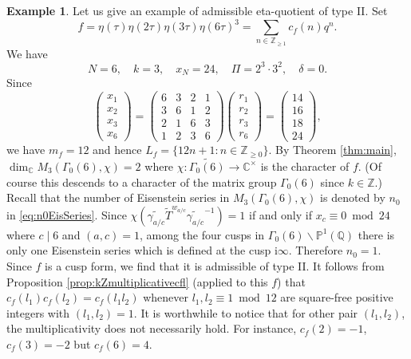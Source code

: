 \documentclass[12pt]{amsart}
\numberwithin{equation}{section}
\theoremstyle{plain}
\theoremstyle{definition}
\newtheorem{examp}[thm]{Example}
\theoremstyle{remark}
\newcommand\rmi{\mathrm{i}}
\newcommand\numZ{\mathbb{Z}}
\newcommand\numC{\mathbb{C}}
\newcommand\projQ{\mathbb{P}^1(\mathbb{Q})}
\newcommand\numgeq[2]{\mathbb{#1}_{\geq #2}}
\begin{document}
\begin{examp}
Let us give an example of admissible eta-quotient of type II. Set
$$
f=\eta(\tau)\eta(2\tau)\eta(3\tau)\eta(6\tau)^3=\sum_{n\in\numgeq{Z}{1}}c_f(n)q^n.
$$
We have
\begin{equation*}
N=6,\quad k=3,\quad x_N=24,\quad\varPi=2^3\cdot3^2,\quad\delta=0.
\end{equation*}
Since
\begin{equation*}
\begin{pmatrix}
x_1 \\ x_2 \\ x_3 \\ x_{6}
\end{pmatrix}=
\begin{pmatrix}
6 & 3 & 2 & 1 \\
3  & 6 & 1 & 2 \\
2 & 1 & 6 & 3 \\
1 & 2 & 3 & 6
\end{pmatrix}
\begin{pmatrix}
r_1 \\ r_2 \\ r_3 \\ r_{6}
\end{pmatrix}=
\begin{pmatrix}
14 \\ 16 \\ 18 \\ 24
\end{pmatrix},
\end{equation*}
we have $m_f=12$ and hence $L_f=\{12n+1\colon n\in\numgeq{Z}{0}\}$. By Theorem \ref{thm:main}, $\dim_\numC M_3(\Gamma_0(6),\chi)=2$ where $\chi\colon\widetilde{\Gamma_0(6)}\rightarrow\numC^\times$ is the character of $f$. (Of course this descends to a character of the matrix group $\Gamma_0(6)$ since $k\in\numZ$.) Recall that the number of Eisenstein series in $M_3(\Gamma_0(6),\chi)$ is denoted by $n_0$ in \eqref{eq:n0EisSeries}. Since $\chi(\widetilde{\gamma_{a/c}}\widetilde{T}^{w_{a/c}}\widetilde{\gamma_{a/c}}^{-1})=1$ if and only if $x_c\equiv0\bmod{24}$ where $c\mid 6$ and $(a,c)=1$, among the four cusps in $\Gamma_0(6)\backslash\projQ$ there is only one Eisenstein series which is defined at the cusp $\rmi\infty$. Therefore $n_0=1$. Since $f$ is a cusp form, we find that it is admissible of type II. It follows from Proposition \ref{prop:kZmultiplicativecfl} (applied to this $f$) that $c_f(l_1)c_f(l_2)=c_f(l_1l_2)$ whenever $l_1,l_2\equiv1\bmod{12}$ are square-free positive integers with $(l_1,l_2)=1$. It is worthwhile to notice that for other pair $(l_1,l_2)$, the multiplicativity does not necessarily hold. For instance, $c_f(2)=-1$, $c_f(3)=-2$ but $c_f(6)=4$.
\end{examp}
\end{document}
